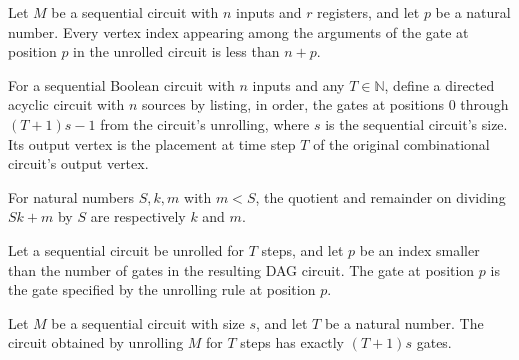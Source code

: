 \begin{theorem}
\label{BoolCircuit.SeqCircuit.args_unrollGate_lt}
\leanok
{}
Let $M$ be a sequential circuit with $n$ inputs and $r$ registers, and let $p$ be a
natural number. Every vertex index appearing among the arguments of the gate at position
$p$ in the unrolled circuit is less than $n+p$.
\end{theorem}

\begin{definition}
\label{BoolCircuit.SeqCircuit.unroll}
\leanok
{}
For a sequential Boolean circuit with $n$ inputs and any $T\in\mathbb{N}$, define a
directed acyclic circuit with $n$ sources by listing, in order, the gates at positions
$0$ through $(T+1)s-1$ from the circuit's unrolling, where $s$ is the sequential
circuit's size. Its output vertex is the placement at time step $T$ of the original
combinational circuit's output vertex.
\end{definition}

\begin{theorem}
\label{BoolCircuit.SeqCircuit.div_mod_block}
\leanok
{}
For natural numbers $S,k,m$ with $m<S$, the quotient and remainder on dividing $Sk+m$ by
$S$ are respectively $k$ and $m$.
\end{theorem}

\begin{theorem}
\label{BoolCircuit.SeqCircuit.getElem_unroll_gates}
\leanok
{}
Let a sequential circuit be unrolled for $T$ steps, and let $p$ be an index smaller than
the number of gates in the resulting DAG circuit. The gate at position $p$ is the gate
specified by the unrolling rule at position $p$.
\end{theorem}

\begin{theorem}
\label{BoolCircuit.SeqCircuit.length_unroll_gates}
\leanok
{}
Let $M$ be a sequential circuit with size $s$, and let $T$ be a natural number. The
circuit obtained by unrolling $M$ for $T$ steps has exactly $(T+1)s$ gates.
\end{theorem}

